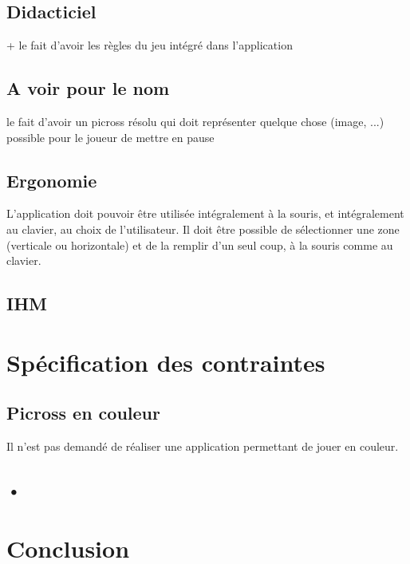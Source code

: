 \documentclass{report}
\begin{document}
		\section{Didacticiel}
			+ le fait d'avoir les règles du jeu intégré dans l'application
		
		\section{A voir pour le nom}
			le fait d'avoir un picross résolu qui doit représenter quelque chose (image, ...)
			possible pour le joueur de mettre en pause

		\section{Ergonomie}
			L'application doit pouvoir être utilisée intégralement à la souris, et intégralement au clavier, au choix de l'utilisateur.
			Il doit être possible de sélectionner une zone (verticale ou horizontale) et de la remplir d'un seul coup, à la souris comme au clavier.
			
		\section{IHM}
			
\chapter{Spécification des contraintes}

	\section{Picross en couleur}
		Il n'est pas demandé de réaliser une application permettant de jouer en couleur. 
		
	\section{•}
			
\chapter{Conclusion}
		
		
\end{document}
